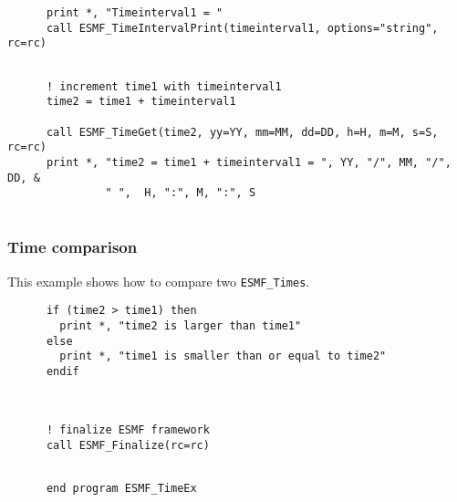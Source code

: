 
 \begin{verbatim}
      print *, "Timeinterval1 = "
      call ESMF_TimeIntervalPrint(timeinterval1, options="string", rc=rc)
 
\end{verbatim}
 

 \begin{verbatim}
      ! increment time1 with timeinterval1
      time2 = time1 + timeinterval1

      call ESMF_TimeGet(time2, yy=YY, mm=MM, dd=DD, h=H, m=M, s=S, rc=rc)
      print *, "time2 = time1 + timeinterval1 = ", YY, "/", MM, "/", DD, &
               " ",  H, ":", M, ":", S
 
\end{verbatim}
 

  \subsubsection{Time comparison}
 
   This example shows how to compare two {\tt ESMF\_Times}. 

 \begin{verbatim}
      if (time2 > time1) then
        print *, "time2 is larger than time1"
      else
        print *, "time1 is smaller than or equal to time2"
      endif

 
\end{verbatim}
 

 \begin{verbatim}
      ! finalize ESMF framework
      call ESMF_Finalize(rc=rc)
 
\end{verbatim}
 

 \begin{verbatim}
      end program ESMF_TimeEx
 
\end{verbatim}

\setlength{\parskip}{\oldparskip}
\setlength{\parindent}{\oldparindent}
\setlength{\baselineskip}{\oldbaselineskip}
